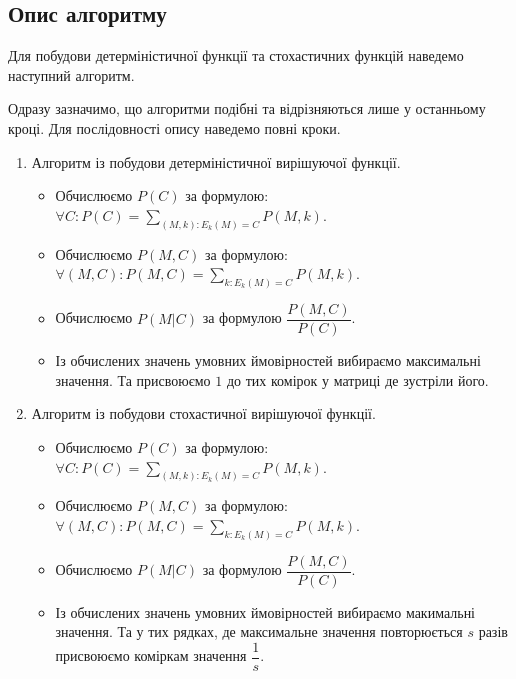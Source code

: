 \subsection{Опис алгоритму}
Для побудови детерміністичної функції та стохастичних функцій наведемо наступний алгоритм.

\begin{remark}
	Одразу зазначимо, що алгоритми подібні та відрізняються лише у останньому кроці. Для послідовності опису наведемо повні кроки. 
\end{remark}

\begin{algorithm}
    \begin{enumerate}
    	\item Алгоритм із побудови детерміністичної вирішуючої функції.
    		\begin{itemize}
       		 \item Обчислюємо $P(C)$ за формулою: $\forall C: P(C) = \sum_{(M, k): E_k(M) = C} P(M, k)$.
        		\item Обчислюємо $P(M,C)$ за формулою: $\forall (M, C): P(M, C) = \sum_{k: E_k(M) = C} P(M, k)$. 
        		\item Обчислюємо $P(M|C)$ за формулою $\dfrac{P(M,C)}{P(C)}$.
        		\item Із обчислених значень умовних ймовірностей вибираємо максимальні значення. Та присвоюємо $1$ до тих комірок у матриці де зустріли його.
    		\end{itemize}

    	\item Алгоритм із побудови стохастичної вирішуючої функції.
    		\begin{itemize}
       		 \item Обчислюємо $P(C)$ за формулою: $\forall C: P(C) = \sum_{(M, k): E_k(M) = C} P(M, k)$.
        		\item Обчислюємо $P(M,C)$ за формулою: $\forall (M, C): P(M, C) = \sum_{k: E_k(M) = C} P(M, k)$. 
        		\item Обчислюємо $P(M|C)$ за формулою $\dfrac{P(M,C)}{P(C)}$.
        		\item Із обчислених значень умовних ймовірностей вибираємо макимальні значення. Та у тих рядках, де максимальне значення повторюється $s$ разів присвоюємо коміркам значення $\dfrac{1}{s}$. 
    		\end{itemize}
	\end{enumerate}
\end{algorithm}


